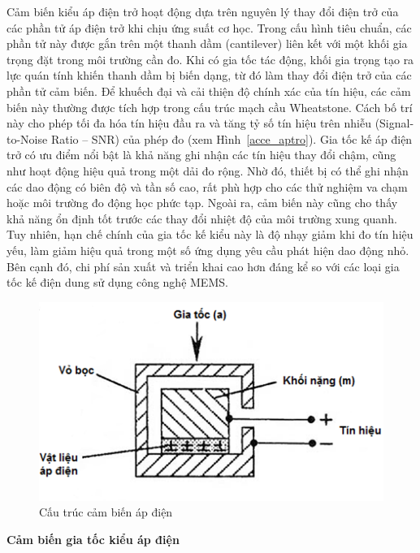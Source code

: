 Cảm biến kiểu áp điện trở hoạt động dựa trên nguyên lý thay đổi điện trở của các phần tử áp điện trở khi chịu ứng suất cơ học. Trong cấu hình tiêu chuẩn, các phần tử này được gắn trên một thanh dầm (cantilever) liên kết với một khối gia trọng đặt trong môi trường cần đo. Khi có gia tốc tác động, khối gia trọng tạo ra lực quán tính khiến thanh dầm bị biến dạng, từ đó làm thay đổi điện trở của các phần tử cảm biến. Để khuếch đại và cải thiện độ chính xác của tín hiệu, các cảm biến này thường được tích hợp trong cấu trúc mạch cầu Wheatstone. Cách bố trí này cho phép tối đa hóa tín hiệu đầu ra và tăng tỷ số tín hiệu trên nhiễu (Signal-to-Noise Ratio – SNR) của phép đo (xem Hình~\ref{acce_aptro}). Gia tốc kế áp điện trở có ưu điểm nổi bật là khả năng ghi nhận các tín hiệu thay đổi chậm, cũng như hoạt động hiệu quả trong một dải đo rộng. Nhờ đó, thiết bị có thể ghi nhận các dao động có biên độ và tần số cao, rất phù hợp cho các thử nghiệm va chạm hoặc môi trường đo động học phức tạp. Ngoài ra, cảm biến này cũng cho thấy khả năng ổn định tốt trước các thay đổi nhiệt độ của môi trường xung quanh. Tuy nhiên, hạn chế chính của gia tốc kế kiểu này là độ nhạy giảm khi đo tín hiệu yếu, làm giảm hiệu quả trong một số ứng dụng yêu cầu phát hiện dao động nhỏ. Bên cạnh đó, chi phí sản xuất và triển khai cao hơn đáng kể so với các loại gia tốc kế điện dung sử dụng công nghệ MEMS.




\begin{figure} [!]
		\centering
 		\includegraphics[width=\textwidth]{images/acce_apdien.png}
 		\vspace*{-7mm}
		\caption{Cấu trúc cảm biến áp điện}
		\label{acce_apdien}
  \FloatBarrier
\end{figure}
\textbf{Cảm biến gia tốc kiểu áp điện}

